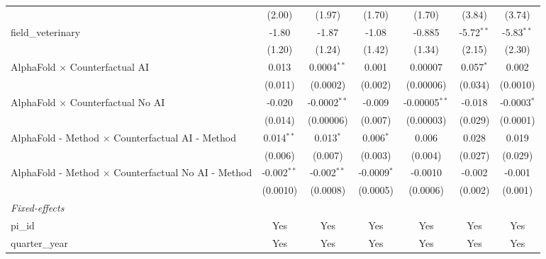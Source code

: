 \begin{tabular}{lcccccc}
                                                               & (2.00)         & (1.97)         & (1.70)         & (1.70)          & (3.84)       & (3.74)\\   
   field\_veterinary                                           & -1.80          & -1.87          & -1.08          & -0.885          & -5.72$^{**}$ & -5.83$^{**}$\\   
                                                               & (1.20)         & (1.24)         & (1.42)         & (1.34)          & (2.15)       & (2.30)\\   
   AlphaFold $\times$ Counterfactual AI                        & 0.013          & 0.0004$^{**}$  & 0.001          & 0.00007         & 0.057$^{*}$  & 0.002\\   
                                                               & (0.011)        & (0.0002)       & (0.002)        & (0.00006)       & (0.034)      & (0.0010)\\   
   AlphaFold $\times$ Counterfactual No AI                     & -0.020         & -0.0002$^{**}$ & -0.009         & -0.00005$^{**}$ & -0.018       & -0.0003$^{*}$\\   
                                                               & (0.014)        & (0.00006)      & (0.007)        & (0.00003)       & (0.029)      & (0.0001)\\   
   AlphaFold - Method $\times$ Counterfactual AI - Method      & 0.014$^{**}$   & 0.013$^{*}$    & 0.006$^{*}$    & 0.006           & 0.028        & 0.019\\   
                                                               & (0.006)        & (0.007)        & (0.003)        & (0.004)         & (0.027)      & (0.029)\\   
   AlphaFold - Method $\times$ Counterfactual No AI - Method   & -0.002$^{**}$  & -0.002$^{**}$  & -0.0009$^{*}$  & -0.0010         & -0.002       & -0.001\\   
                                                               & (0.0010)       & (0.0008)       & (0.0005)       & (0.0006)        & (0.002)      & (0.001)\\   
   \midrule
   \emph{Fixed-effects}\\
   pi\_id                                                      & Yes            & Yes            & Yes            & Yes             & Yes          & Yes\\  
   quarter\_year                                               & Yes            & Yes            & Yes            & Yes             & Yes          & Yes\\  

\end{tabular}
